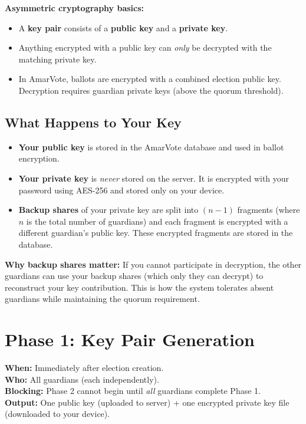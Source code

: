 \documentclass[12pt,a4paper]{book}
\begin{document}
\begin{tcolorbox}[cryptobox]
\textbf{Asymmetric cryptography basics:}
\begin{itemize}
  \item A \textbf{key pair} consists of a \textbf{public key} and a \textbf{private key}.
  \item Anything encrypted with a public key can \emph{only} be decrypted with the matching private key.
  \item In AmarVote, ballots are encrypted with a combined election public key. Decryption requires guardian private keys (above the quorum threshold).
\end{itemize}
\end{tcolorbox}

\section{What Happens to Your Key}

\begin{itemize}
  \item \textbf{Your public key} is stored in the AmarVote database and used in ballot encryption.
  \item \textbf{Your private key} is \emph{never} stored on the server. It is encrypted with your password using AES-256 and stored only on your device.
  \item \textbf{Backup shares} of your private key are split into $(n-1)$ fragments (where $n$ is the total number of guardians) and each fragment is encrypted with a different guardian's public key. These encrypted fragments are stored in the database.
\end{itemize}

\begin{tcolorbox}[notebox]
\textbf{Why backup shares matter:} If you cannot participate in decryption, the other guardians can use your backup shares (which only they can decrypt) to reconstruct your key contribution. This is how the system tolerates absent guardians while maintaining the quorum requirement.
\end{tcolorbox}

\chapter{Phase 1: Key Pair Generation}
\label{ch:guard-phase1}

\begin{tcolorbox}[phasebox,title={Phase 1: Key Pair Generation}]
\textbf{When:} Immediately after election creation.\\
\textbf{Who:} All guardians (each independently).\\
\textbf{Blocking:} Phase 2 cannot begin until \emph{all} guardians complete Phase 1.\\
\textbf{Output:} One public key (uploaded to server) + one encrypted private key file (downloaded to your device).
\end{tcolorbox}
\end{document}
